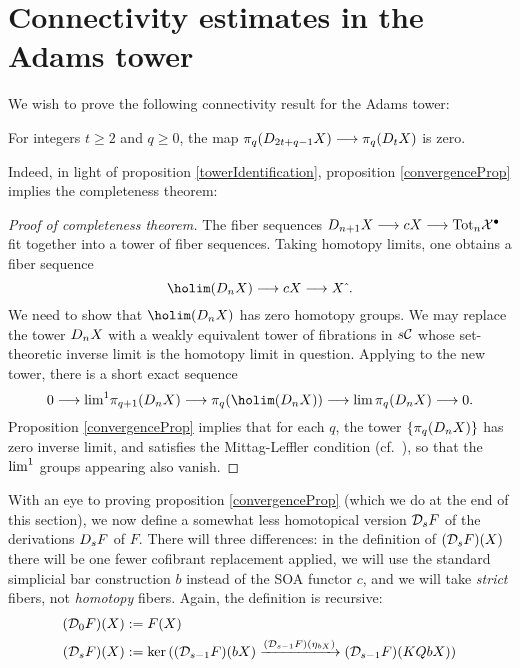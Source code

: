 \documentclass[11pt]{amsart}
\theoremstyle{plain}
\newcommand{\dupdown}[2]{D_{\smash{#1}}}
\newcommand{\caldup}[1]{\calD_{\smash{#1}}}
\begin{document}
\section{Connectivity estimates in the Adams tower}
\label{sec:connectivityAnalysis}
We wish to prove the following connectivity result for the Adams tower:
\begin{prop}\label{convergenceProp}
For integers $t\geq2$ and $q\geq0$, the map $\pi_q(\dupdown{2t+q-1}{c}X)\to\pi_q(\dupdown{t}{c}X)$ is zero.
\end{prop}
\noindent Indeed, in light of proposition \ref{towerIdentification}, proposition \ref{convergenceProp} implies the completeness theorem:
\begin{proof}[Proof of completeness theorem]
The fiber sequences $\dupdown{n+1}{c}X\to cX\to \textup{Tot}_n\calX^\bullet$ fit together into a tower of fiber sequences. Taking homotopy limits, one obtains a fiber sequence
\[\holim (\dupdown{n}{c}X)\to cX\to X\hat{\ }.\]
We need to show that $\holim (\dupdown{n}{c}X)$ has zero homotopy groups.
We may replace the tower $\dupdown{n}{c}X$ with a weakly equivalent tower of fibrations in $s\mathcal{C}$ whose set-theoretic inverse limit is the homotopy limit in question. Applying \cite[Proposition 6.14]{goerss-jardine.pdf} to the new tower, there is a short exact sequence
\[0\to \textup{lim}^1\pi_{q+1}(\dupdown{n}{c}X)\to \pi_q(\holim (\dupdown{n}{c}X))\to \textup{lim}\,\pi_{q}(\dupdown{n}{c}X)\to 0.\]
Proposition \ref{convergenceProp} implies that for each $q$, the tower $\{\pi_{q}(\dupdown{n}{c}X)\}$ has zero inverse limit, and satisfies the Mittag-Leffler condition (cf.\ \cite[p.264]{YellowMonster}), so that the $\textup{lim}^1$ groups appearing also vanish.
\end{proof}
With an eye to proving proposition \ref{convergenceProp} (which we do at the end of this section), we now define a somewhat less homotopical version $\caldup{s}F$ of the derivations $\dupdown{s}{b}F$ of $F$. There will three differences: in the definition of $(\caldup{s}F)(X)$ there will be one fewer cofibrant replacement applied, we will use the standard simplicial bar construction $b$ instead of the SOA functor $c$, and we will take \emph{strict} fibers, not \emph{homotopy} fibers. Again, the definition is recursive:
\begin{alignat*}{2}
(\caldup{0}F)(X)
&:=
F(X)%
\\
(\caldup{s}F)(X)
&:=
\ker((\caldup{s-1}F)(bX)\xrightarrow{(\caldup{s-1}F)(\eta_{bX})} (\caldup{s-1}F)(KQbX))
\end{alignat*}
\end{document}
